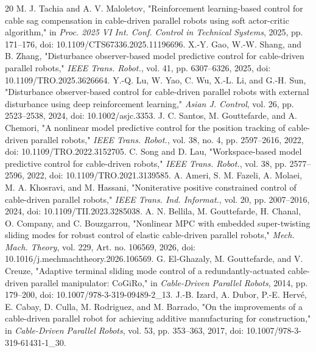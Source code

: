 \documentclass[conference]{IEEEtran}
\begin{document}
\begin{thebibliography}{20}
 M. J. Tachia and A. V. Maloletov, "Reinforcement learning-based control for cable sag compensation in cable-driven parallel robots using soft actor-critic algorithm," in \emph{Proc. 2025 VI Int. Conf. Control in Technical Systems}, 2025, pp. 171--176, doi: 10.1109/CTS67336.2025.11196696.
 X.-Y. Gao, W.-W. Shang, and B. Zhang, "Disturbance observer-based model predictive control for cable-driven parallel robots," \emph{IEEE Trans. Robot.}, vol. 41, pp. 6307--6326, 2025, doi: 10.1109/TRO.2025.3626664.
 Y.-Q. Lu, W. Yao, C. Wu, X.-L. Li, and G.-H. Sun, "Disturbance observer-based control for cable-driven parallel robots with external disturbance using deep reinforcement learning," \emph{Asian J. Control}, vol. 26, pp. 2523--2538, 2024, doi: 10.1002/asjc.3353.
 J. C. Santos, M. Gouttefarde, and A. Chemori, "A nonlinear model predictive control for the position tracking of cable-driven parallel robots," \emph{IEEE Trans. Robot.}, vol. 38, no. 4, pp. 2597--2616, 2022, doi: 10.1109/TRO.2022.3152705.
 C. Song and D. Lau, "Workspace-based model predictive control for cable-driven robots," \emph{IEEE Trans. Robot.}, vol. 38, pp. 2577--2596, 2022, doi: 10.1109/TRO.2021.3139585.
 A. Ameri, S. M. Fazeli, A. Molaei, M. A. Khosravi, and M. Hassani, "Noniterative positive constrained control of cable-driven parallel robots," \emph{IEEE Trans. Ind. Informat.}, vol. 20, pp. 2007--2016, 2024, doi: 10.1109/TII.2023.3285038.
 A. N. Bellila, M. Gouttefarde, H. Chanal, O. Company, and C. Bouzgarrou, "Nonlinear MPC with embedded super-twisting sliding modes for robust control of elastic cable-driven parallel robots," \emph{Mech. Mach. Theory}, vol. 229, Art. no. 106569, 2026, doi: 10.1016/j.mechmachtheory.2026.106569.
 G. El-Ghazaly, M. Gouttefarde, and V. Creuze, "Adaptive terminal sliding mode control of a redundantly-actuated cable-driven parallel manipulator: CoGiRo," in \emph{Cable-Driven Parallel Robots}, 2014, pp. 179--200, doi: 10.1007/978-3-319-09489-2\_13.
 J.-B. Izard, A. Dubor, P.-E. Hervé, E. Cabay, D. Culla, M. Rodriguez, and M. Barrado, "On the improvements of a cable-driven parallel robot for achieving additive manufacturing for construction," in \emph{Cable-Driven Parallel Robots}, vol. 53, pp. 353--363, 2017, doi: 10.1007/978-3-319-61431-1\_30.
\end{thebibliography}
\end{document}
